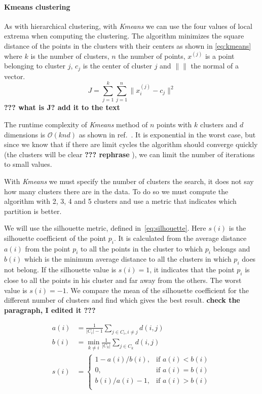 \paragraph{Kmeans clustering}

As with hierarchical clustering, with \emph{Kmeans} we can use the four values of local extrema when computing the clustering. The algorithm minimizes the square distance of the points in the clusters with their centers as shown in \cref{eq:kmeans} where $k$ is the number of clusters, $n$ the number of points, $x^{(j)}$ is a point belonging to cluster $j$, $c_j$ is the center of cluster $j$ and $\| \|$ the normal of a vector.
\begin{equation}\label{eq:kmeans}
J = \sum_{j=1}^k \sum_{j=1}^n \| x_i^{(j)} - c_j \|^2
\end{equation}
{\bf ??? what is J? add it to the text}

The runtime complexity of \emph{Kmeans} method of $n$ points with $k$ clusters and $d$ dimensions is $\mathcal{O}(knd)$ as shown in ref.~\cite{arthur_k-means_2009}.  It is exponential in the worst case, but since we know that if there are limit cycles the algorithm should converge quickly (the clusters will be clear
{\bf ??? rephrase}
), we can limit the number of iterations to small values.

With \emph{Kmeans} we must specify the number of clusters the search, it does not say how many clusters there are in the data. To do so we must compute the algorithm with 2, 3, 4 and 5 clusters and use a metric that indicates which partition is better.

We will use the silhouette metric, defined in~\cref{eq:silhouette}. Here $s(i)$ is the silhouette coefficient of the point $p_i$. It is calculated from the average distance $a(i)$ from the point $p_i$ to all the points in the cluster to which $p_i$ belongs and $b(i)$ which is the minimum average distance to all the clusters in which $p_i$ does not belong. 
If the silhouette value is $s(i) = 1$, it indicates that the point $p_i$ is close to all the points in his cluster and far away from the others. The worst value is $s(i) = -1$. We compare the mean of the silhouette coefficient for the different number of clusters and find which gives the best result.
{\bf check the paragraph, I edited it ???}

\begin{align}\label{eq:silhouette}
    a(i) &= \frac{1}{|C_i| - 1} \sum_{j \in C_i, i \neq j} d(i, j) \nonumber \\
    b(i) &= \min_{k \neq i} \frac{1}{|C_k|} \sum_{j \in C_k} d(i, j) \nonumber \\
    s(i) &= \begin{cases}
          1-a(i)/b(i), & \mbox{if } a(i) < b(i) \\
          0,  & \mbox{if } a(i) = b(i) \\
          b(i)/a(i)-1, & \mbox{if } a(i) > b(i) \\
        \end{cases}
\end{align}